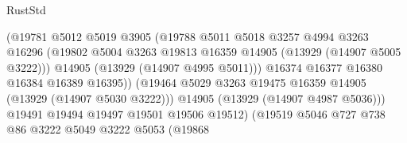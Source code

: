 \begin{lexlean}{RustStd}
\begin{coremodule}
                                          (@19781
                                            @5012
                                            @5019
                                            @3905
                                            (@19788
                                              @5011
                                              @5018
                                              @3257
                                              @4994
                                              @3263
                                              @16296
                                              (@19802
                                                @5004
                                                @3263
                                                @19813
                                                @16359
                                                @14905
                                                (@13929 (@14907 @5005 @3222)))
                                              @14905
                                              (@13929 (@14907 @4995 @5011)))
                                            @16374
                                            @16377
                                            @16380
                                            @16384
                                            @16389
                                            @16395))
                                        (@19464
                                          @5029
                                          @3263
                                          @19475
                                          @16359
                                          @14905
                                          (@13929 (@14907 @5030 @3222)))
                                        @14905
                                        (@13929 (@14907 @4987 @5036)))
                                      @19491
                                      @19494
                                      @19497
                                      @19501
                                      @19506
                                      @19512)
                                    (@19519
                                      @5046
                                      @727
                                      @738
                                      @86
                                      @3222
                                      @5049
                                      @3222
                                      @5053
                                      (@19868

\end{coremodule}
\end{lexlean}
